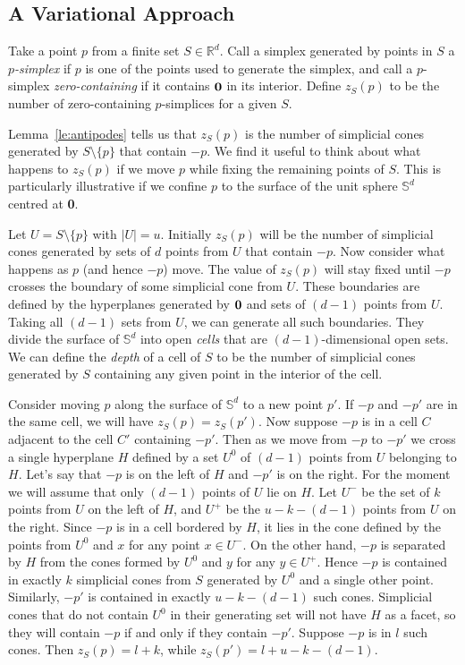 \documentclass[epsbox,12pt,reqno]{amsart}
\theoremstyle{definition}
\theoremstyle{remark}
\def\R{\mathbb{R}}
\def\Sph{\mathbb{S}}
\def\zero{{\bf 0}}
\begin{document}
\subsection{A Variational Approach}\label{se:var}
Take a point $p$ from a finite set $S \in \R^d$. 
Call a simplex generated by points in $S$ a {\it $p$-simplex} if
$p$ is one of the points used to generate the simplex, and
call a $p$-simplex {\it zero-containing} if it contains $\zero$ in its interior.
Define $z_S(p)$ to be the number of zero-containing $p$-simplices for a
given $S$.

Lemma~\ref{le:antipodes} tells us that $z_S(p)$ is the number of 
simplicial cones generated by $S \setminus \{p\}$ that contain $-p$.  
We find it useful to think about what happens to $z_S(p)$
if we move $p$ while fixing the remaining points of $S$.  
This is particularly illustrative if we confine $p$ to the surface 
of the unit sphere $\Sph^{d}$ centred at \zero.

Let $U = S \setminus \{p\}$ with $|U| = u$.
Initially $z_S(p)$ will be the number of simplicial cones generated
by sets of $d$ points from $U$ that contain $-p$.  Now consider
what happens as $p$ (and hence $-p$) move.  The value of $z_S(p)$ will
stay fixed until $-p$ crosses the boundary of some simplicial cone
from $U$.  These boundaries are defined by the hyperplanes 
generated by $\zero$ and sets of $(d-1)$ points from $U$.  
Taking all $(d-1)$ sets from $U$, we can generate all such boundaries.
They divide the surface of $\Sph^d$ into open {\it cells} that are
$(d-1)$-dimensional open sets.  We can define the {\it depth} of a cell 
of $S$ to be the number of simplicial cones generated by $S$ containing
any given point in the interior of the cell.

Consider moving $p$ along the surface of $\Sph^d$ to a new point
$p'$.  If $-p$ and $-p'$ are in the same cell, we will have 
$z_S(p)=z_S(p')$.  Now suppose $-p$ is in a cell $C$ adjacent to 
the cell $C'$ containing $-p'$.
Then as we move from $-p$ to $-p'$ we cross a single hyperplane $H$
defined by a set $U^0$ of $(d-1)$ points from $U$ belonging to $H$.  
Let's say that 
$-p$ is on the left of $H$ and $-p'$ is on the right.  
For the moment we will assume that only $(d-1)$ points of $U$
lie on $H$.
Let $U^-$ be the
set of $k$ points from $U$ on the left of $H$, and $U^+$ be the
$u-k-(d-1)$ points from $U$ on the right.  Since $-p$ is in
a cell bordered by $H$, it lies in the cone defined by the points
from $U^0$ and $x$ for any point $x \in U^-$.  On the other hand,
$-p$ is separated by $H$ from the cones formed by $U^0$ and $y$ 
for any $y \in U^+$.  Hence $-p$ is contained in exactly $k$
simplicial cones from $S$ generated by $U^0$ and a single other
point.  Similarly, $-p'$ is contained in exactly $u-k-(d-1)$ such
cones.  Simplicial cones that do not contain $U^0$ in their generating 
set will not have $H$ as a facet, so they will contain $-p$ if and only
if they contain $-p'$.  Suppose $-p$ is in $l$ such cones.
Then $z_S(p)=l+k$, while $z_S(p')=l+u-k-(d-1)$.
\end{document}
